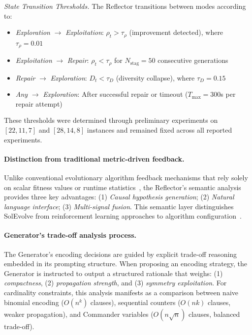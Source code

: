 \textit{State Transition Thresholds.} The Reflector transitions between modes according to:
\begin{itemize}
\item \textit{Exploration} $\to$ \textit{Exploitation}: $\rho_t > \tau_\rho$ (improvement detected), where $\tau_\rho = 0.01$
\item \textit{Exploitation} $\to$ \textit{Repair}: $\rho_t < \tau_\rho$ for $N_{\text{stag}} = 50$ consecutive generations
\item \textit{Repair} $\to$ \textit{Exploration}: $D_t < \tau_D$ (diversity collapse), where $\tau_D = 0.15$
\item \textit{Any} $\to$ \textit{Exploration}: After successful repair or timeout ($T_{\max} = 300$s per repair attempt)
\end{itemize}
These thresholds were determined through preliminary experiments on $[22,11,7]$ and $[28,14,8]$ instances and remained fixed across all reported experiments.

\paragraph{Distinction from traditional metric-driven feedback.} Unlike conventional evolutionary algorithm feedback mechanisms that rely solely on scalar fitness values or runtime statistics~\cite{Meyerson2024LLM_EA_Match}, the Reflector's semantic analysis provides three key advantages: (1) \textit{Causal hypothesis generation}; (2) \textit{Natural language interface}; (3) \textit{Multi-signal fusion}. This semantic layer distinguishes SolEvolve from reinforcement learning approaches to algorithm configuration~\cite{Sharma2019}.

\paragraph{Generator's trade-off analysis process.} The Generator's encoding decisions are guided by explicit trade-off reasoning embedded in its prompting structure. When proposing an encoding strategy, the Generator is instructed to output a structured rationale that weighs: (1) \textit{compactness}, (2) \textit{propagation strength}, and (3) \textit{symmetry exploitation}. For cardinality constraints, this analysis manifests as a comparison between naive binomial encoding ($O(n^k)$ clauses), sequential counters ($O(nk)$ clauses, weaker propagation), and Commander variables ($O(n\sqrt{n})$ clauses, balanced trade-off).

